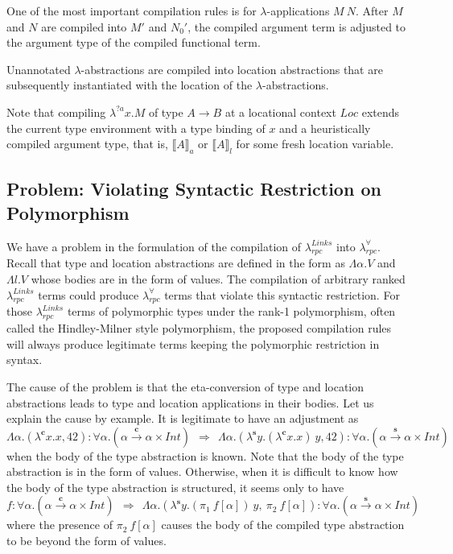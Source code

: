 \documentclass[a4paper]{article}
\theoremstyle{plain}
\theoremstyle{definition}
\newcommand{\polyrpc}{$\lambda_{rpc}^{\forall}$\xspace}
\newcommand{\linksrpc}{$\lambda_{rpc}^{Links}$\xspace}
\newcommand{\client}{\textbf{c}}
\newcommand{\server}{\textbf{s}}
\newcommand{\lamL}[3]{\lambda^{#1}#2.#3}
\newcommand{\funL}[1]{\xrightarrow{#1}}
\newcommand{\linkstycomp}[2]{\llbracket#1\rrbracket_{#2}}
\newcommand{\adjcomp}[4]{#1:#2 \Rightarrow #3:#4}
\newcommand{\Loc}{Loc}
\begin{document}
%
One of the most important compilation rules is for $\lambda$-applications $M
\ N$.
%
After $M$ and $N$ are compiled into $M'$ and $N_0'$, the compiled
argument term is adjusted to the argument type of the compiled
functional term.

%
Unannotated $\lambda$-abstractions are compiled into location
abstractions that are subsequently instantiated with the location of
the $\lambda$-abstractions.

%
Note that compiling $\lamL{?a}{x}{M}$ of type $A \rightarrow B$ at a
locational context $\Loc$ extends the current type environment with a
type binding of $x$ and a heuristically compiled argument type, that
is, $\linkstycomp{A}{a}$ or $\linkstycomp{A}{l}$ for some fresh location
variable.

\subsection{Problem: Violating Syntactic Restriction on Polymorphism}

%
We have a problem in the formulation of the compilation of \linksrpc
into \polyrpc.
%
Recall that type and location abstractions are defined in the form as
$\Lambda\alpha.V$ and $\Lambda l.V$ whose bodies are in the form of
values.
%
The compilation of arbitrary ranked \linksrpc terms could produce
\polyrpc terms that violate this syntactic restriction.
%
For those \linksrpc terms of polymorphic types under the rank-1
polymorphism, often called the Hindley-Milner style polymorphism, the
proposed compilation rules will always produce legitimate terms
keeping the polymorphic restriction in syntax.

%
The cause of the problem is that the eta-conversion of type and
location abstractions leads to type and location applications in their
bodies.
%
Let us explain the cause by example.
%
It is legitimate to have an adjustment as
\[
\adjcomp{\Lambda\alpha.(\lamL{\client}{x}{x}, 42)}
        {\forall\alpha.(\alpha\funL{\client}\alpha\times Int) \ \ }
        {\ \ \Lambda\alpha.(\lamL{\server}{y}{(\lamL{\client}{x}{x}) \ y}, 42)}
        {\forall\alpha.(\alpha\funL{\server}\alpha\times Int)}
\]
when the body of the type abstraction is known.
%
Note that the body of the type abstraction is in the form of values.
%
Otherwise, when it is difficult to know how the body of the type
abstraction is structured, it seems only to have
\[
\adjcomp{f}
        {\forall\alpha.(\alpha\funL{\client}\alpha\times Int) \ \ }
        {\ \ \Lambda\alpha.(\lamL{\server}{y}{ (\pi_1 \ f[\alpha]) \ y}, \ \pi_2 \ f[\alpha])}
        {\forall\alpha.(\alpha\funL{\server}\alpha\times Int)}
\]
where the presence of $\pi_2 \ f[\alpha]$ causes the body of the
compiled type abstraction to be beyond the form of values.
\end{document}
